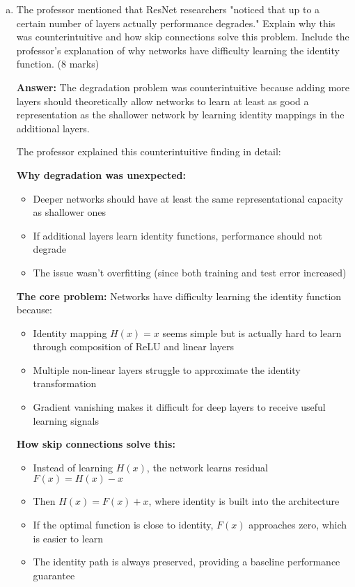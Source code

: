 \documentclass[12pt]{article}
\newcommand{\answer}[1]{{\color{answercolor}\textbf{Answer:} #1}}
\newcommand{\explanation}[1]{{\color{explanationcolor}#1}}
\begin{document}
\begin{enumerate}[(a)]
    \item The professor mentioned that ResNet researchers "noticed that up to a certain number of layers actually performance degrades." Explain why this was counterintuitive and how skip connections solve this problem. Include the professor's explanation of why networks have difficulty learning the identity function. \hfill (8 marks)
    
    \answer{The degradation problem was counterintuitive because adding more layers should theoretically allow networks to learn at least as good a representation as the shallower network by learning identity mappings in the additional layers.}
    
    \explanation{
    The professor explained this counterintuitive finding in detail:
    
    \textbf{Why degradation was unexpected:}
    \begin{itemize}
        \item Deeper networks should have at least the same representational capacity as shallower ones
        \item If additional layers learn identity functions, performance should not degrade
        \item The issue wasn't overfitting (since both training and test error increased)
    \end{itemize}
    
    \textbf{The core problem:} Networks have difficulty learning the identity function because:
    \begin{itemize}
        \item Identity mapping $H(x) = x$ seems simple but is actually hard to learn through composition of ReLU and linear layers
        \item Multiple non-linear layers struggle to approximate the identity transformation
        \item Gradient vanishing makes it difficult for deep layers to receive useful learning signals
    \end{itemize}
    
    \textbf{How skip connections solve this:}
    \begin{itemize}
        \item Instead of learning $H(x)$, the network learns residual $F(x) = H(x) - x$
        \item Then $H(x) = F(x) + x$, where identity is built into the architecture
        \item If the optimal function is close to identity, $F(x)$ approaches zero, which is easier to learn
        \item The identity path is always preserved, providing a baseline performance guarantee
    \end{itemize}
    }
    

\end{enumerate}
\end{document}
